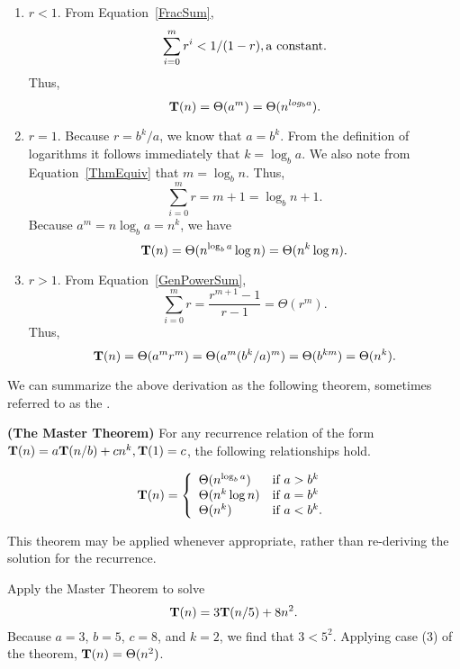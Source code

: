 \begin{enumerate}

\item
\(r < 1.\)
From Equation~\ref{FracSum},
\[\sum_{i=0}^{m}r^i < 1/(1-r), {\rm a~constant.}\]
\noindent Thus,
\[{\bf T}(n) = \Theta(a^m) = \Theta(n^{log_ba}).\]

\item
\(r = 1.\)
Because \(r = b^k/a\), we know that \(a = b^k\).
From the definition of logarithms it follows immediately that
\(k = \log_ba\).
\noindent We also note from Equation~\ref{ThmEquiv} that \(m = \log_b n\).
Thus,
\[\sum_{i=0}^{m} r = m + 1 = \log_bn + 1.\]
\noindent Because \(a^m = n \log_b a = n^k\), we have
\[{\bf T}(n) = \Theta(n^{\log_ba}\log n) = \Theta(n^k\log n).\]

\item
\(r > 1.\)
From Equation~\ref{GenPowerSum},
\[\sum_{i=0}^{m} r = \frac{r^{m+1} - 1}{r - 1} = \Theta(r^m).\]
\noindent Thus,
\[{\bf T}(n) = \Theta(a^mr^m)
       = \Theta(a^m(b^k/a)^m)
       = \Theta(b^{km})
       = \Theta(n^k).\]
\end{enumerate}

We can summarize the above derivation as the following theorem,
sometimes referred to as the .

\begin{theorem}
\label{RecurThm}
\textbf{(The Master Theorem)} For any recurrence relation of the form
\({\bf T}(n) = a{\bf T}(n/b) + cn^k, {\bf T}(1) = c\),
the following relationships hold.

\[{\bf T}(n) = \left\{ \begin{array}{ll}
                   \Theta(n^{\log_ba}) & \mbox{if \(a > b^k\)} \\
                   \Theta(n^k\log n)   & \mbox{if \(a = b^k\)} \\
                   \Theta(n^k)         & \mbox{if \(a < b^k\).}
                  \end{array}
         \right. \]
\end{theorem}

This theorem may be applied whenever appropriate, rather than
re-deriving the solution for the recurrence.

\begin{example}
Apply the Master Theorem to solve
\[{\bf T}(n) = 3{\bf T}(n/5) + 8n^2.\]
\noindent Because $a = 3$, $b = 5$, $c = 8$, and $k = 2$, we find that
$3 < 5^2$.
Applying case (3) of the theorem, \({\bf T}(n) = \mbox{$\Theta(n^2)$}\).
\end{example}

